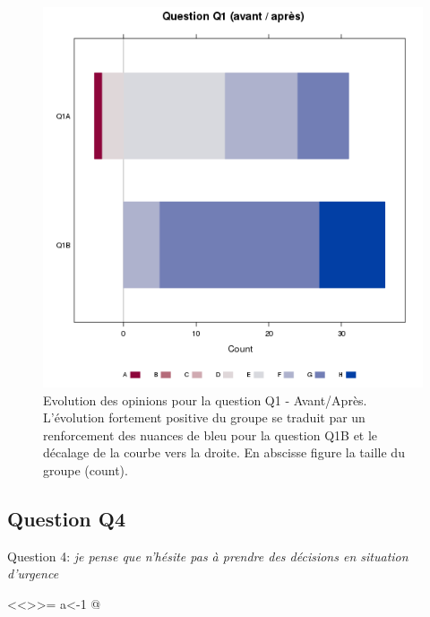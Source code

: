 \documentclass[12pt,english,french]{article}\usepackage{graphicx, color}
\makeatletter
\def\maxwidth{ %
  \ifdim\Gin@nat@width>\linewidth
    \linewidth
  \else
    \Gin@nat@width
  \fi
}
\newenvironment{knitrout}{}{} %
\makeatother
\begin{document}
\begin{figure}
\begin{center}
\begin{knitrout}
\color{fgcolor}
\includegraphics[width=\maxwidth]{../figure/unnamed-chunk-10.png} 

\end{knitrout}

\end{center}
\caption{Evolution des opinions pour la question Q1 - Avant/Après. L'évolution fortement positive du groupe se traduit par un renforcement des nuances de bleu pour la question Q1B et le décalage de la courbe vers la droite. En abscisse figure la taille du groupe (count).}
\label{Q1_likert}
\end{figure}

\subsection{ Question Q4}

Question 4: \emph{je pense que n'hésite pas à prendre des décisions en situation d'urgence}

<<>>=
a<-1
@
 

\end{document}
